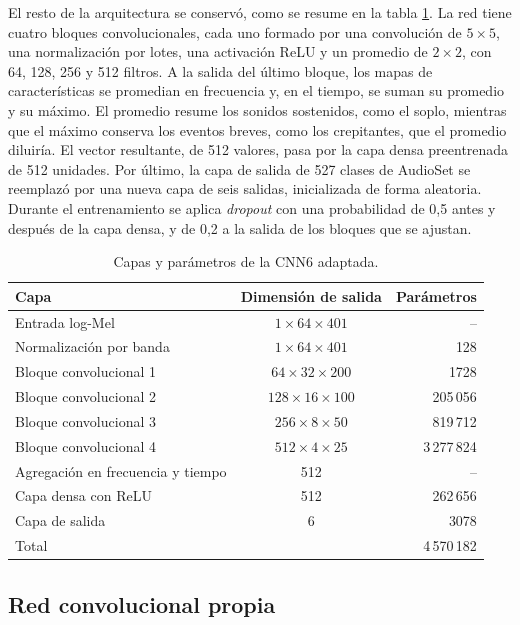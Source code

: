 El resto de la arquitectura se conservó, como se resume en la tabla \ref{tab:capasCnn6}. La red
tiene cuatro bloques convolucionales, cada uno formado por una convolución de $5 \times 5$, una
normalización por lotes, una activación ReLU y un promedio de $2 \times 2$, con 64, 128, 256 y 512
filtros. A la salida del último bloque, los mapas de características se promedian en frecuencia y,
en el tiempo, se suman su promedio y su máximo. El promedio resume los sonidos sostenidos, como el
soplo, mientras que el máximo conserva los eventos breves, como los crepitantes, que el promedio
diluiría. El vector resultante, de 512 valores, pasa por la capa densa preentrenada de 512
unidades. Por último, la capa de salida de 527 clases de AudioSet se reemplazó por una nueva capa
de seis salidas, inicializada de forma aleatoria. Durante el entrenamiento se aplica
\textit{dropout} con una probabilidad de 0,5 antes y después de la capa densa, y de 0,2 a la salida
de los bloques que se ajustan.

\begin{table}[htbp]
	\centering
	\caption[Capas y parámetros de la CNN6 adaptada]{Capas y parámetros de la CNN6 adaptada.}
	\label{tab:capasCnn6}
	\small
	\begin{tabular}{l c r}
		\toprule
		\textbf{Capa} & \textbf{Dimensión de salida} & \textbf{Parámetros} \\
		\midrule
		Entrada log-Mel & $1 \times 64 \times 401$ & -- \\
		Normalización por banda & $1 \times 64 \times 401$ & 128 \\
		Bloque convolucional 1 & $64 \times 32 \times 200$ & 1728 \\
		Bloque convolucional 2 & $128 \times 16 \times 100$ & 205\,056 \\
		Bloque convolucional 3 & $256 \times 8 \times 50$ & 819\,712 \\
		Bloque convolucional 4 & $512 \times 4 \times 25$ & 3\,277\,824 \\
		Agregación en frecuencia y tiempo & 512 & -- \\
		Capa densa con ReLU & 512 & 262\,656 \\
		Capa de salida & 6 & 3078 \\
		Total & & 4\,570\,182 \\
		\bottomrule
	\end{tabular}
\end{table}

\subsection{Red convolucional propia}
\label{subsec:redPropia}

